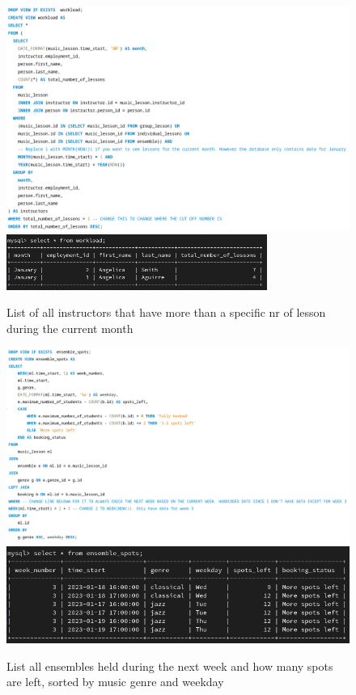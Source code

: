\documentclass[a4paper]{scrreprt}
\begin{document}
\begin{figure}[h]
    \begin{center}
        \includegraphics[width=\textwidth]{../img/workloadSQLv2.png} \\
        \includegraphics[width=0.76\textwidth]{../img/workloadV2.png}
        \caption{List of all instructors that have more than a specific nr of lesson \\during the current month}
        \label{fig:workload}
    \end{center}
\end{figure}
\begin{figure}[h]
    \begin{center}
        \includegraphics[width=\textwidth]{../img/ensembleSQLv2.png} \\
        \includegraphics[width=\textwidth]{../img/ensembleSpotsV2.png}
        \caption{List all ensembles held during the next week and how many spots are left, sorted by music genre and weekday}
        \label{fig:ensemble}
    \end{center}
\end{figure}
\end{document}
